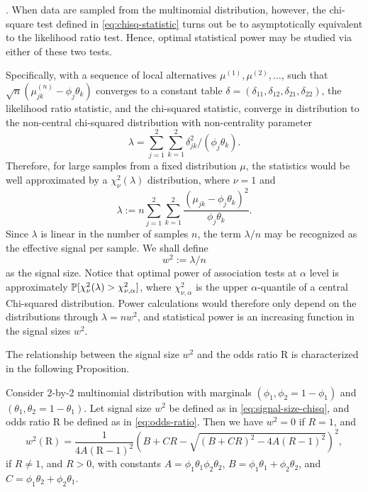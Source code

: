  \cite{gao2019upass}.
When data are sampled from the multinomial distribution, however, the chi-square test defined in \eqref{eq:chisq-statistic} turns out be to asymptotically equivalent to the likelihood ratio test.
Hence, optimal statistical power may be studied via either of these two tests.

Specifically, with a sequence of local alternatives $\mu^{(1)}, \mu^{(2)}, \ldots$, such that $\sqrt{n}(\mu^{(n)}_{jk} - \phi_j\theta_k)$ converges to a constant table $\delta = (\delta_{11}, \delta_{12}, \delta_{21}, \delta_{22})$, the likelihood ratio statistic, and the chi-squared statistic, converge in distribution to the non-central chi-squared distribution with non-centrality parameter 
$$\lambda = \sum_{j=1}^2 \sum_{k=1}^2 {\delta_{jk}^2}/{(\phi_j\theta_k)}.$$
Therefore, for large samples from a fixed distribution $\mu$, the statistics would be well approximated by a $\chi^2_\nu(\lambda)$ distribution, where $\nu=1$ and
\begin{equation} 
    \lambda := n\sum_{j=1}^2 \sum_{k=1}^2 \frac{(\mu_{jk} - \phi_j\theta_k)^2}{\phi_j\theta_k}.
\end{equation}
Since $\lambda$ is linear in the number of samples $n$, the term $\lambda/n$ may be recognized as the effective signal per sample.
We shall define 
\begin{equation} \label{eq:signal-size-chisq}
    w^2:=\lambda/n
\end{equation} 
as the signal size.
Notice that optimal power of association tests at $\alpha$ level is approximately $\P[\chi^2_{\nu}(\lambda)>\chi^2_{\nu,\alpha}]$, where $\chi^2_{\nu,\alpha}$ is the upper $\alpha$-quantile of a central Chi-squared distribution.
Power calculations would therefore only depend on the distributions through $\lambda=nw^2$, and statistical power is an increasing function in the signal sizes $w^2$.

The relationship between the signal size $w^2$ and the odds ratio $\text{R}$ is characterized in the following Proposition.

\begin{theorem} \label{thm:signal-size-odds-ratio}
Consider 2-by-2 multinomial distribution with marginals $(\phi_1, \phi_2 = 1-\phi_1)$ and $(\theta_1, \theta_2 = 1-\theta_1)$.
Let signal size $w^2$ be defined as in \eqref{eq:signal-size-chisq}, and odds ratio $\text{R}$ be defined as in \eqref{eq:odds-ratio}. 
Then we have $w^2 = 0$ if $R=1$, and
\begin{equation} \label{eq:signal-size-odds-ratio}
    w^2(\text{R}) =
    \frac{1}{4A(\text{R}-1)^2}\left(B+CR-\sqrt{(B+CR)^2-4A(R-1)^2}\right)^2,
\end{equation}
if $R\neq1$, and $R>0$, 
with constants $A = \phi_1\theta_1\phi_2\theta_2$, $B = \phi_1\theta_1+\phi_2\theta_2$, and $C = \phi_1\theta_2+\phi_2\theta_1$.
\end{theorem}

